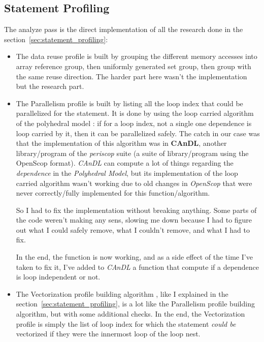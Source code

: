 \documentclass[paper=a4, fontsize=11pt]{scrartcl}
\numberwithin{equation}{section}        %
\numberwithin{figure}{section}          %
\numberwithin{table}{section}               %
\begin{document}
    \subsection{Statement Profiling}
    The analyze pass is the direct implementation of all the research done in the section~\ref{sec:statement_profiling}:
    \begin{itemize}
        \item The data reuse profile is built by grouping the
            different memory accesses into array reference group, then uniformly generated set group,
            then group with the same reuse direction. The harder part here wasn't the
            implementation but the research part.

        \item The Parallelism profile is built by listing all the loop index that could be
            parallelized for the statement. It is done by using the loop carried algorithm
            of the polyhedral model : if for a loop index, not a single one dependence is
            loop carried by it, then it can be parallelized safely.
            The catch in our case was that the implementation of this algorithm was in
            \textbf{CAnDL}, another library/program of the \textit{periscop} suite (a suite of
            library/program using the OpenScop format). \textit{CAnDL} can compute
            a lot of things regarding the \textit{dependence} in the \textit{Polyhedral Model},
            but its implementation of the loop carried algorithm wasn't working due to old
            changes in \textit{OpenScop} that were never correctly/fully implemented for this
            function/algorithm.
            
            So I had to fix the implementation without breaking anything.
            Some parts of the code weren't making any sens, slowing me down because I had
            to figure out what I could safely remove, what I couldn't remove, and what I
            had to fix.

            In the end, the function is now working, and as a side effect of the time I've taken
            to fix it, I've added to \textit{CAnDL} a function that compute if a dependence
            is loop independent or not.
        \item The Vectorization profile building algorithm
            , like I explained in the section~\ref{sec:statement_profiling}, is a lot like
            the Parallelism profile building algorithm, but with some additional checks.
            In the end, the Vectorization profile is simply the list of loop index for which
            the statement \textit{could be} vectorized if they were the innermost loop of the loop nest.\\


\end{itemize}
\end{document}
